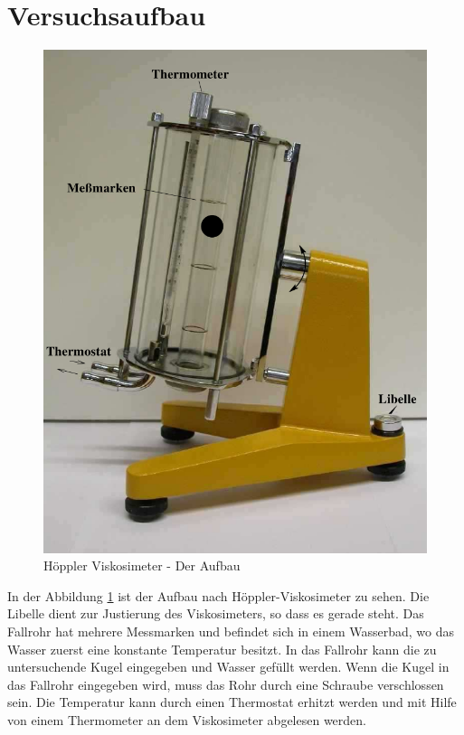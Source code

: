 \section{Versuchsaufbau}

\begin{figure}[h!]
	\centering
	\includegraphics[width=0.5\linewidth]{BildKugelfall.png}
	\caption{Höppler Viskosimeter - Der Aufbau}
	\label{fig:aufbau}
\end{figure}
In der Abbildung \ref{fig:aufbau} ist der Aufbau nach Höppler-Viskosimeter zu sehen. Die Libelle dient zur Justierung des Viskosimeters, so dass es gerade steht. 
Das Fallrohr hat mehrere Messmarken und befindet sich in einem Wasserbad, wo das Wasser zuerst eine konstante Temperatur besitzt. In das Fallrohr kann die zu untersuchende Kugel eingegeben und Wasser gefüllt werden. 
Wenn die Kugel in das Fallrohr eingegeben wird, muss das Rohr durch eine Schraube verschlossen sein. Die Temperatur kann durch einen Thermostat erhitzt werden und mit Hilfe von einem Thermometer an dem Viskosimeter 
abgelesen werden.
\newpage

